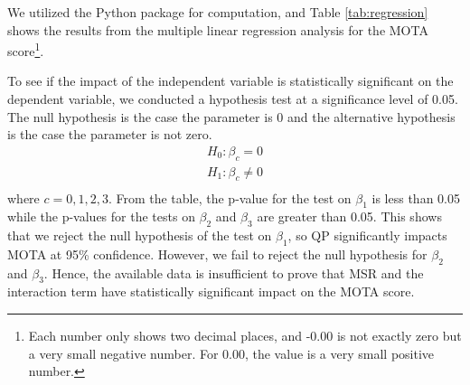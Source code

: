 We utilized the Python package \cite{seabold_statsmodels_2010} for computation, and Table \ref{tab:regression} shows the results from the multiple linear regression analysis for the MOTA score\footnote{Each number only shows two decimal places, and -0.00 is not exactly zero but a very small negative number. For 0.00, the value is a very small positive number.}.

To see if the impact of the independent variable is statistically significant on the dependent variable, we conducted a hypothesis test at a significance level of 0.05. The null hypothesis is the case the parameter is 0 and the alternative hypothesis is the case the parameter is not zero.
\begin{equation}
    \begin{aligned}
        H_0: \beta_c = 0 \\
        H_1: \beta_c \neq 0 \\
    \end{aligned}
\end{equation}
where $c=0,1,2,3$. From the table, the p-value for the test on $\beta_1$ is less than 0.05 while the p-values for the tests on $\beta_2$ and $\beta_3$ are greater than 0.05. This shows that we reject the null hypothesis of the test on $\beta_1$, so QP significantly impacts MOTA at 95\% confidence. However, we fail to reject the null hypothesis for $\beta_2$ and $\beta_3$. Hence, the available data is insufficient to prove that MSR and the interaction term have statistically significant impact on the MOTA score.

